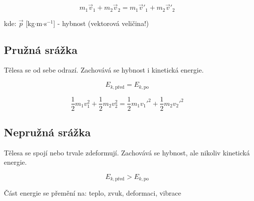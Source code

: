 \documentclass[a4paper,11pt]{article}
\begin{document}
\begin{equationbox}
\begin{equation*}
    m_1\vec{v}_1 + m_2\vec{v}_2 = m_1\vec{v}'_1 + m_2\vec{v}'_2
\end{equation*}
\end{equationbox}

\begin{notebox}
kde: $\vec{p}$ [kg$\cdot$m$\cdot$s$^{-1}$] - hybnost (vektorová veličina!)
\end{notebox}

\subsection{Pružná srážka}

\begin{definitionbox}
Tělesa se od sebe odrazí. Zachovává se hybnost i kinetická energie.
\end{definitionbox}

\begin{equationbox}
\begin{equation*}
    E_{k,\text{před}} = E_{k,\text{po}}
\end{equation*}
\end{equationbox}

\begin{equationbox}
\begin{equation*}
    \frac{1}{2}m_1v_1^2 + \frac{1}{2}m_2v_2^2 = \frac{1}{2}m_1v_1'^2 + \frac{1}{2}m_2v_2'^2
\end{equation*}
\end{equationbox}

\subsection{Nepružná srážka}

\begin{definitionbox}
Tělesa se spojí nebo trvale zdeformují. Zachovává se hybnost, ale nikoliv kinetická energie.
\end{definitionbox}

\begin{equationbox}
\begin{equation*}
    E_{k,\text{před}} > E_{k,\text{po}}
\end{equation*}
\end{equationbox}

\begin{notebox}
Část energie se přemění na: teplo, zvuk, deformaci, vibrace
\end{notebox}
\end{document}
